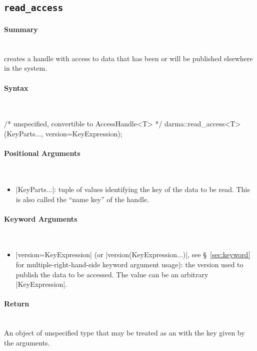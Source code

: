 \subsection{\texttt{read\_access}}
\label{ssec:api_fe_read_access}

\paragraph{Summary}\mbox{}\\
 creates a \gls{handle} with  access to data that has been or will be
published elsewhere in the system.


\paragraph{Syntax}\mbox{}\\
\begin{CppCode}
/* unspecified, convertible to AccessHandle<T> */
darma::read_access<T>(KeyParts..., version=KeyExpression);
\end{CppCode}


\paragraph{Positional Arguments}\mbox{}\\
\begin{itemize}
  \item |KeyParts...|: tuple of values identifying the key of the data to
  be read.  This is also called the ``name key'' of the handle.
\end{itemize}

\paragraph{Keyword Arguments}\mbox{}\\
\begin{itemize}
  \item |version=KeyExpression| (or |version(KeyExpression...)|,
see \S~\ref{sec:keyword} for multiple-right-hand-side keyword argument usage):
the version used to publish the data to be accessed.
The value can be an arbitrary |KeyExpression|.
\end{itemize}


\paragraph{Return}\mbox{}\\
An object of unspecified type that may be treated as an 
with the key given by the arguments.

